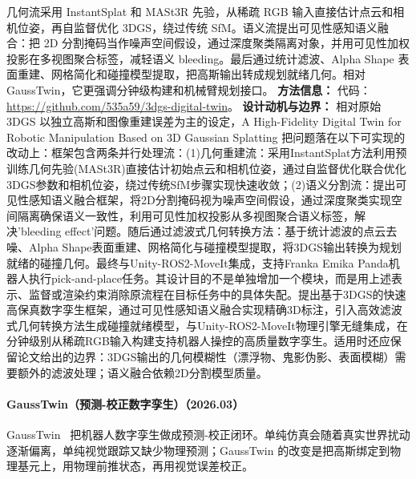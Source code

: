 几何流采用 InstantSplat 和 MASt3R 先验，从稀疏 RGB 输入直接估计点云和相机位姿，再自监督优化 3DGS，绕过传统 SfM。语义流提出可见性感知语义融合：把 2D 分割掩码当作噪声空间假设，通过深度聚类隔离对象，并用可见性加权投影在多视图聚合标签，减轻语义 bleeding。最后通过统计滤波、Alpha Shape 表面重建、网格简化和碰撞模型提取，把高斯输出转成规划就绪几何。相对 GaussTwin，它更强调分钟级构建和机械臂规划接口。
\textbf{方法信息：} 代码：\url{https://github.com/535a59/3dgs-digital-twin}。
\textbf{设计动机与边界：} 相对原始 3DGS 以独立高斯和图像重建误差为主的设定，A High-Fidelity Digital Twin for Robotic Manipulation Based on 3D Gaussian Splatting 把问题落在以下可实现的改动上：框架包含两条并行处理流：(1)几何重建流：采用InstantSplat方法利用预训练几何先验(MASt3R)直接估计初始点云和相机位姿，通过自监督优化联合优化3DGS参数和相机位姿，绕过传统SfM步骤实现快速收敛；(2)语义分割流：提出可见性感知语义融合框架，将2D分割掩码视为噪声空间假设，通过深度聚类实现空间隔离确保语义一致性，利用可见性加权投影从多视图聚合语义标签，解决'bleeding effect'问题。随后通过滤波式几何转换方法：基于统计滤波的点云去噪、Alpha Shape表面重建、网格简化与碰撞模型提取，将3DGS输出转换为规划就绪的碰撞几何。最终与Unity-ROS2-MoveIt集成，支持Franka Emika Panda机器人执行pick-and-place任务。其设计目的不是单独增加一个模块，而是用上述表示、监督或渲染约束消除原流程在目标任务中的具体失配。提出基于3DGS的快速高保真数字孪生框架，通过可见性感知语义融合实现精确3D标注，引入高效滤波式几何转换方法生成碰撞就绪模型，与Unity-ROS2-MoveIt物理引擎无缝集成，在分钟级别从稀疏RGB输入构建支持机器人操控的高质量数字孪生。适用时还应保留论文给出的边界：3DGS输出的几何模糊性（漂浮物、鬼影伪影、表面模糊）需要额外的滤波处理；语义融合依赖2D分割模型质量。
\paragraph{GaussTwin（预测-校正数字孪生）（2026.03）}
GaussTwin~\cite{2603_05108} 把机器人数字孪生做成预测-校正闭环。单纯仿真会随着真实世界扰动逐渐偏离，单纯视觉跟踪又缺少物理预测；GaussTwin 的改变是把高斯绑定到物理基元上，用物理前推状态，再用视觉误差校正。

